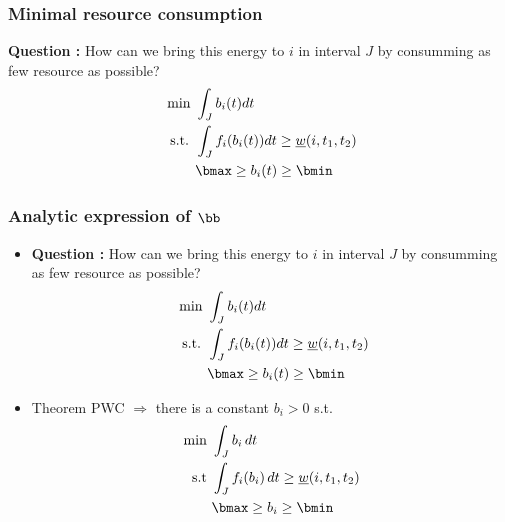 \begin{frame}
  \frametitle{Minimal resource consumption}
  \begin{center}
    
  \end{center}
  \vfill
  \textbf{Question : }
  How can we bring this energy to $i$ in interval $J$ by consumming as few resource as possible?
  \vfill
  \begin{align*}
    \text{ min }& \int_{J} b_i(t)dt  \\
    \text{ s.t. } & \int_{J}f_i(b_i(t))dt \ge  \underline{w}(i,t_1,t_2) \\
                &  \bmax \ge b_i(t) \ge \bmin
  \end{align*}
  \vfill
\end{frame}

\begin{frame}
  \frametitle{Analytic expression of $\bb$}
  \vfill
  \begin{itemize}
  \item  \textbf{Question : }
    How can we bring this energy to $i$ in interval $J$ by consumming as few resource as possible?
    \vfill
    \begin{align*}
      \text{ min }& \int_{J} b_i(t)dt  \\
      \text{ s.t. } & \int_{J}f_i(b_i(t))dt \ge  \underline{w}(i,t_1,t_2) \\
                  &  \bmax \ge b_i(t) \ge \bmin
    \end{align*}
    \vfill
  \item Theorem PWC $\Rightarrow$ there is a constant $b_{i} > 0 $
    s.t. 
    \begin{align*}
      \text{min }  & \int_{J} b_i\,dt  \\
      \text{s.t } & \int_{J}f_i(b_i)\,dt \ge
                    \underline{w}(i,t_1,t_2)\\
                   & \bmax \ge b_i \ge \bmin
    \end{align*}
  \end{itemize}
  \vfill
\end{frame}

